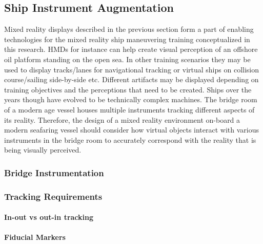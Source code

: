 
\subsection{Ship Instrument Augmentation}

Mixed reality displays described in the previous section form a part of enabling technologies for the mixed reality ship maneuvering training conceptualized in this research. HMDs for instance can help create visual perception of an offshore oil platform standing on the open sea. In other training scenarios they may be used to display tracks/lanes for navigational tracking or virtual ships on collision course/sailing side-by-side etc. Different artifacts may be displayed depending on training objectives and the perceptions that need to be created. Ships over the years though have evolved to be technically complex machines. The bridge room of a modern age vessel houses multiple instruments tracking different aspects of its reality. Therefore, the design of a mixed reality environment on-board a modern seafaring vessel should consider how virtual objects interact with various instruments in the bridge room to accurately correspond with the reality that is being visually perceived.  

\subsubsection{Bridge Instrumentation}



\subsubsection{Tracking Requirements}

\paragraph{In-out vs out-in tracking}

\paragraph{Fiducial Markers}
